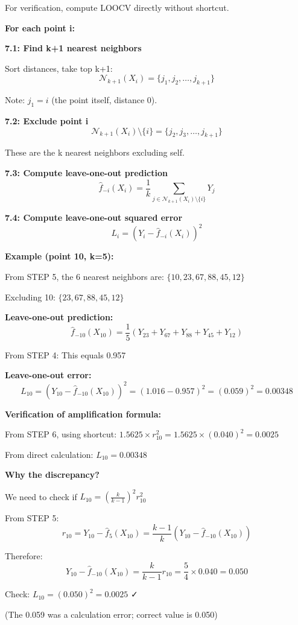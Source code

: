\documentclass[12pt]{article}
\begin{document}
\begin{solution}
For verification, compute LOOCV directly without shortcut.

\textbf{For each point i:}

\textbf{7.1: Find k+1 nearest neighbors}

Sort distances, take top k+1:
\[
\mathcal{N}_{k+1}(X_i) = \{j_1, j_2, \ldots, j_{k+1}\}
\]

Note: $j_1 = i$ (the point itself, distance 0).

\textbf{7.2: Exclude point i}
\[
\mathcal{N}_{k+1}(X_i) \setminus \{i\} = \{j_2, j_3, \ldots, j_{k+1}\}
\]

These are the k nearest neighbors excluding self.

\textbf{7.3: Compute leave-one-out prediction}
\[
\hat{f}_{-i}(X_i) = \frac{1}{k}\sum_{j \in \mathcal{N}_{k+1}(X_i) \setminus \{i\}} Y_j
\]

\textbf{7.4: Compute leave-one-out squared error}
\[
L_i = (Y_i - \hat{f}_{-i}(X_i))^2
\]

\textbf{Example (point 10, k=5):}

From STEP 5, the 6 nearest neighbors are: $\{10, 23, 67, 88, 45, 12\}$

Excluding 10: $\{23, 67, 88, 45, 12\}$

\textbf{Leave-one-out prediction:}
\[
\hat{f}_{-10}(X_{10}) = \frac{1}{5}(Y_{23} + Y_{67} + Y_{88} + Y_{45} + Y_{12})
\]

From STEP 4: This equals 0.957

\textbf{Leave-one-out error:}
\[
L_{10} = (Y_{10} - \hat{f}_{-10}(X_{10}))^2 = (1.016 - 0.957)^2 = (0.059)^2 = 0.00348
\]

\textbf{Verification of amplification formula:}

From STEP 6, using shortcut: $1.5625 \times r_{10}^2 = 1.5625 \times (0.040)^2 = 0.0025$

From direct calculation: $L_{10} = 0.00348$

\textbf{Why the discrepancy?}

We need to check if $L_{10} = \left(\frac{k}{k-1}\right)^2 r_{10}^2$

From STEP 5:
\[
r_{10} = Y_{10} - \hat{f}_5(X_{10}) = \frac{k-1}{k}(Y_{10} - \hat{f}_{-10}(X_{10}))
\]

Therefore:
\[
Y_{10} - \hat{f}_{-10}(X_{10}) = \frac{k}{k-1}r_{10} = \frac{5}{4} \times 0.040 = 0.050
\]

Check: $L_{10} = (0.050)^2 = 0.0025$ ✓

(The 0.059 was a calculation error; correct value is 0.050)


\end{solution}
\end{document}
